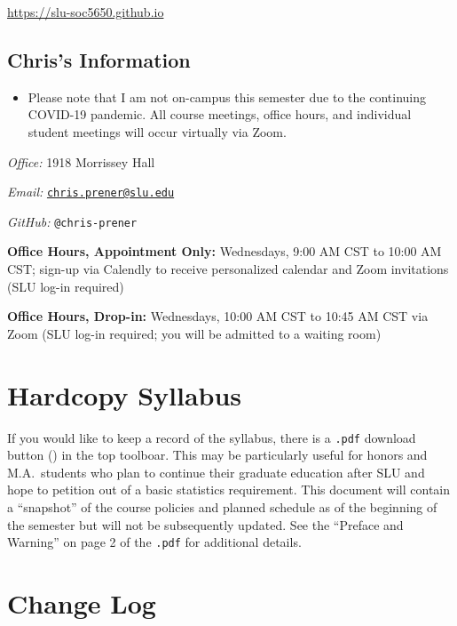 \documentclass[
]{book}
\newenvironment{rmdblock}[1]
  {\begin{shaded*}
  \begin{itemize}
  \renewcommand{\labelitemi}{
    \raisebox{-.7\height}[0pt][0pt]{
      {\setkeys{Gin}{width=3em,keepaspectratio}\texttt{[image: images/\#1]}}
    }
  }
  \item
  }
  {
  \end{itemize}
  \end{shaded*}
  }
\newenvironment{rmdwarning}
  {\begin{rmdblock}{warning}}
  {\end{rmdblock}}
\begin{document}
\url{https://slu-soc5650.github.io}

\hypertarget{chriss-information}{%
\subsection*{Chris's Information}\label{chriss-information}}

\begin{rmdwarning}
Please note that I am not on-campus this semester due to the continuing
COVID-19 pandemic. All course meetings, office hours, and individual
student meetings will occur virtually via Zoom.
\end{rmdwarning}

\emph{Office:} 1918 Morrissey Hall

\emph{Email:} \href{mailto:chris.prener@slu.edu}{\nolinkurl{chris.prener@slu.edu}}

\emph{GitHub:} \texttt{@chris-prener}

\textbf{Office Hours, Appointment Only:} Wednesdays, 9:00 AM CST to 10:00 AM CST; sign-up via Calendly to receive personalized calendar and Zoom invitations (SLU log-in required)

\textbf{Office Hours, Drop-in:} Wednesdays, 10:00 AM CST to 10:45 AM CST via Zoom (SLU log-in required; you will be admitted to a waiting room)

\hypertarget{hardcopy-syllabus}{%
\section*{Hardcopy Syllabus}\label{hardcopy-syllabus}}

If you would like to keep a record of the syllabus, there is a \texttt{.pdf} download button () in the top toolboar. This may be particularly useful for honors and M.A.~students who plan to continue their graduate education after SLU and hope to petition out of a basic statistics requirement. This document will contain a ``snapshot'' of the course policies and planned schedule as of the beginning of the semester but will not be subsequently updated. See the ``Preface and Warning'' on page 2 of the \texttt{.pdf} for additional details.

\hypertarget{change-log}{%
\section*{Change Log}\label{change-log}}
\end{document}
